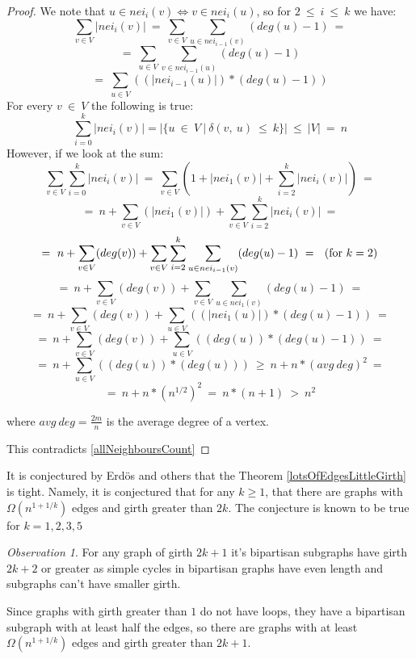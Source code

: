 \documentclass[shortabstract, lic, english]{iithesis}
\theoremstyle{definition} \newtheorem{definition}{Definition}[chapter]
\theoremstyle{remark} \newtheorem{remark}[definition]{Observation}
\theoremstyle{plain} \newtheorem{theorem}[definition]{Theorem}
\theoremstyle{plain} \newtheorem{lemma}[definition]{Lemma}
\theoremstyle{plain} \newtheorem{conjecture}[definition]{Conjecture}
\begin{document}
\begin{proof}
    We note that $u\in nei_i(v) \iff v\in nei_i(u)$, so for $2~\leq~i~\leq~k$ we have:
    $$\sum_{v \in V}|nei_i(v)|~=
    ~\sum_{v \in V}\sum_{u \in nei_{i-1}(v)} (deg(u) - 1)~=$$
    $$=~\sum_{u \in V}\sum_{v \in nei_{i-1}(u)}(deg(u) - 1)$$
    $$=~\sum_{u \in V}((|nei_{i-1}(u)|)*(deg(u) - 1))$$
    For every $v~\in~V$ the following is true:
    \begin{equation}\label{allNeighboursCount}
    \sum_{i=0}^{k} |nei_i(v)|=|\{u~\in~V~|~\delta(v,~u)~\leq~k\}|~\leq~|V|~=~n
    \end{equation}
    However, if we look at the sum:
    $$\sum_{v \in V}\sum_{i=0}^{k} |nei_i(v)|~=
    ~\sum_{v \in V}(1 + |nei_1(v)| + \sum_{i=2}^{k} |nei_i(v)|)~=$$
    $$=~n+\sum_{v \in V}(|nei_1(v)|)+\sum_{v \in V}\sum_{i=2}^{k} |nei_i(v)|~=$$
    $$=~n+\sum_{v \in V}(deg(v))+\sum_{v \in V}\sum_{i=2}^{k}\sum_{u \in nei_{i-1}(v)} (deg(u) - 1)~=~~(\textnormal{for}~k=2)$$
    $$=~n+\sum_{v \in V}(deg(v))+\sum_{v \in V}\sum_{u \in nei_1(v)} (deg(u) -1)~=$$
    $$=~n+\sum_{v \in V}(deg(v))+\sum_{u \in V}((|nei_1(u)|)*(deg(u) -1))~=$$
    $$=~n+\sum_{v \in V}(deg(v))+\sum_{u \in V}((deg(u))*(deg(u) -1))~=$$
    $$=~n+\sum_{u \in V}((deg(u))*(deg(u)))~\geq~n+n*(avg~deg)^2~=$$
    $$=~n+n*(n^{1/2})^2~=~n*(n+1)~>~n^2$$

    where $avg~deg = \frac{2m}{n}$ is the average degree of a vertex.

    This contradicts \ref{allNeighboursCount}
\end{proof}

It is conjectured by Erd{\"o}s \cite{erdos1963} and others that the Theorem \ref{lotsOfEdgesLittleGirth} is tight.
Namely, it is conjectured that for any $k\geq1$, that there are graphs with
$\Omega(n^{1 + 1/k})$ edges and girth greater than $2k$. The conjecture is known to be true for $k=1,2,3,5$

\begin{remark}
For any graph of girth $2k+1$ it's bipartisan subgraphs have girth $2k+2$ or greater as simple cycles in bipartisan graphs have even length and subgraphs can't have smaller girth.
\end{remark}

Since graphs with girth greater than $1$ do not have loops, they have a bipartisan subgraph with at least half the edges, so
there are graphs with at least $\Omega(n^{1 + 1/k})$ edges and girth greater than $2k+1$.
\end{document}
